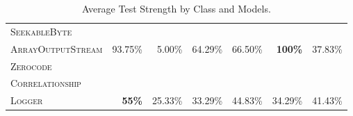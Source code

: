 \begin{table}[H]
\begin{tabular}{| l | r | r | r | r | r | r |}
\hline
\scriptsize\textsc{SeekableByte} &  &  &  &  &  &  \\
\scriptsize\textsc{ArrayOutputStream} & 93.75\% & 5.00\% & 64.29\% & 66.50\% & \textbf{100\%} & 37.83\% \\
\hline
\scriptsize\textsc{Zerocode} &  &  &  &  &  &  \\
\scriptsize\textsc{Correlationship} &  &  &  &  &  &  \\
\scriptsize\textsc{Logger} & \textbf{55\%} & 25.33\% & 33.29\% & 44.83\% & 34.29\% & 41.43\% \\
\hline

\end{tabular}
\caption{Average Test Strength by Class and Models.\protect\footnotemark}
\label{tab:test_strength}
\end{table}

